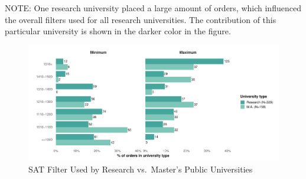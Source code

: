 \documentclass[
  12pt,
]{article}
\begin{document}
\begingroup
\fontsize{8}{8}\selectfont

NOTE: One research university placed a large amount of orders, which influenced the overall filters used for all research universities. The contribution of this particular university is shown in the darker color in the figure.
\endgroup

\begin{figure}
\centering
\includegraphics{eepa_student_list_manuscript_c_a_files/figure-latex/orders-sat-1.pdf}
\caption{\label{fig:orders-sat}SAT Filter Used by Research vs.~Master's Public Universities}
\end{figure}

\pagebreak
\end{document}
